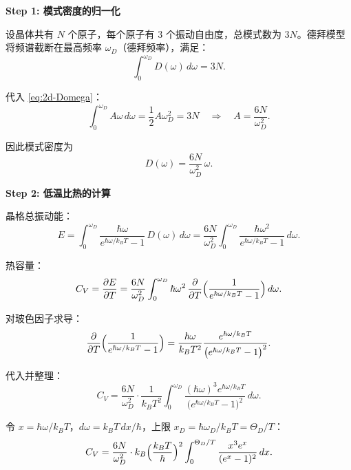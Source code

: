 \begin{derivationbox}[标准解题过程]
\textbf{Step 1: 模式密度的归一化}

设晶体共有 $N$ 个原子，每个原子有 3 个振动自由度，总模式数为 $3N$。德拜模型将频谱截断在最高频率 $\omega_D$（德拜频率），满足：
\begin{equation}
\int_0^{\omega_D}D(\omega)\,d\omega=3N.
\end{equation}

代入 \eqref{eq:2d-Domega}：
\begin{equation}
\int_0^{\omega_D}A\omega\,d\omega=\frac{1}{2}A\omega_D^2=3N
\quad\Longrightarrow\quad
A=\frac{6N}{\omega_D^2}.
\end{equation}

因此模式密度为
\begin{equation}
D(\omega)=\frac{6N}{\omega_D^2}\,\omega.
\end{equation}

\textbf{Step 2: 低温比热的计算}

晶格总振动能：
\begin{equation}
E=\int_0^{\omega_D}\frac{\hbar\omega}{e^{\hbar\omega/k_BT}-1}\,D(\omega)\,d\omega
=\frac{6N}{\omega_D^2}\int_0^{\omega_D}\frac{\hbar\omega^2}{e^{\hbar\omega/k_BT}-1}\,d\omega.
\end{equation}

热容量：
\begin{equation}
C_V=\frac{\partial E}{\partial T}
=\frac{6N}{\omega_D^2}\int_0^{\omega_D}\hbar\omega^2\,\frac{\partial}{\partial T}\Bigl(\frac{1}{e^{\hbar\omega/k_BT}-1}\Bigr)\,d\omega.
\end{equation}

对玻色因子求导：
\begin{equation}
\frac{\partial}{\partial T}\Bigl(\frac{1}{e^{\hbar\omega/k_BT}-1}\Bigr)
=\frac{\hbar\omega}{k_BT^2}\frac{e^{\hbar\omega/k_BT}}{\bigl(e^{\hbar\omega/k_BT}-1\bigr)^2}.
\end{equation}

代入并整理：
\begin{equation}
C_V=\frac{6N}{\omega_D^2}\cdot\frac{1}{k_BT^2}\int_0^{\omega_D}\frac{(\hbar\omega)^3e^{\hbar\omega/k_BT}}{\bigl(e^{\hbar\omega/k_BT}-1\bigr)^2}\,d\omega.
\end{equation}

令 $x=\hbar\omega/k_BT$，$d\omega=k_BT\,dx/\hbar$，上限 $x_D=\hbar\omega_D/k_BT=\Theta_D/T$：
\begin{equation}
C_V=\frac{6N}{\omega_D^2}\cdot k_B\Bigl(\frac{k_BT}{\hbar}\Bigr)^2\int_0^{\Theta_D/T}\frac{x^3e^x}{(e^x-1)^2}\,dx.
\end{equation}


\end{derivationbox}
